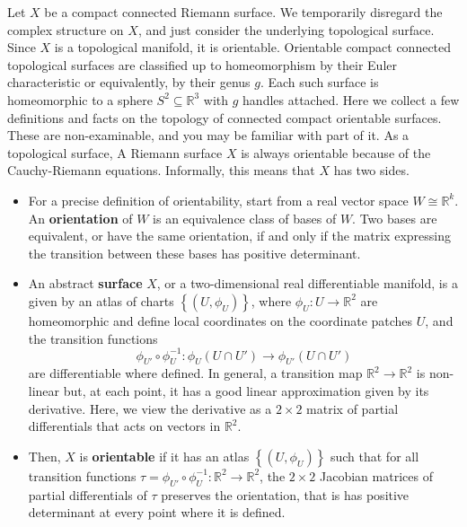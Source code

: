 \documentclass{article}
\newcommand{\R}{\mathbb{R}}
\newcommand{\rb}[1]{\left( #1 \right)}
\newcommand{\cb}[1]{\left\{ #1 \right\}}
\theoremstyle{definition}\newtheorem{definition}{Definition}[section]
\theoremstyle{definition}\newtheorem{notation}[definition]{Notation}
\theoremstyle{definition}\newtheorem{remark}[definition]{Remark}
\theoremstyle{definition}\newtheorem{example1}[definition]{Example}
\theoremstyle{definition}\newtheorem{fact}{Fact}
\theoremstyle{definition}\newtheorem{exercise}{Exercise}
\theoremstyle{definition}\newtheorem*{example2}{Example}
\begin{document}
Let $ X $ be a compact connected Riemann surface. We temporarily disregard the complex structure on $ X $, and just consider the underlying topological surface. Since $ X $ is a topological manifold, it is orientable. Orientable compact connected topological surfaces are classified up to homeomorphism by their Euler characteristic or equivalently, by their genus $ g $. Each such surface is homeomorphic to a sphere $ S^2 \subseteq \R^3 $ with $ g $ handles attached. Here we collect a few definitions and facts on the topology of connected compact orientable surfaces. These are non-examinable, and you may be familiar with part of it. As a topological surface, A Riemann surface $ X $ is always orientable because of the Cauchy-Riemann equations. Informally, this means that $ X $ has two sides.
\begin{itemize}
\item For a precise definition of orientability, start from a real vector space $ W \cong \R^k $. An \textbf{orientation} of $ W $ is an equivalence class of bases of $ W $. Two bases are equivalent, or have the same orientation, if and only if the matrix expressing the transition between these bases has positive determinant.
\item An abstract \textbf{surface} $ X $, or a two-dimensional real differentiable manifold, is a given by an atlas of charts $ \cb{\rb{U, \phi_U}} $, where $ \phi_U : U \to \R^2 $ are homeomorphic and define local coordinates on the coordinate patches $ U $, and the transition functions
$$ \phi_{U'} \circ \phi_U^{-1} : \phi_U\rb{U \cap U'} \to \phi_{U'}\rb{U \cap U'} $$
are differentiable where defined. In general, a transition map $ \R^2 \to \R^2 $ is non-linear but, at each point, it has a good linear approximation given by its derivative. Here, we view the derivative as a $ 2 \times 2 $ matrix of partial differentials that acts on vectors in $ \R^2 $.
\item Then, $ X $ is \textbf{orientable} if it has an atlas $ \cb{\rb{U, \phi_U}} $ such that for all transition functions $ \tau = \phi_{U'} \circ \phi_U^{-1} : \R^2 \to \R^2 $, the $ 2 \times 2 $ Jacobian matrices of partial differentials of $ \tau $ preserves the orientation, that is has positive determinant at every point where it is defined.
\end{itemize}
\end{document}
